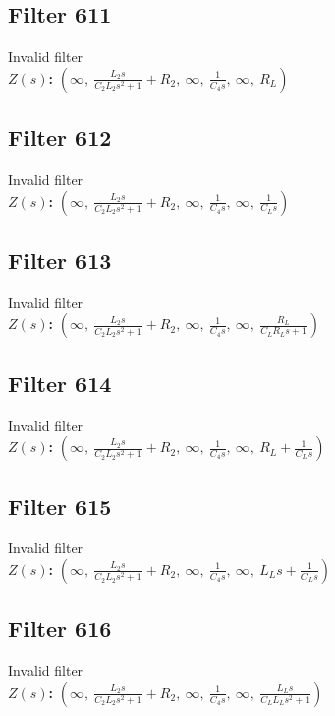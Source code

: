 \documentclass{article}
\begin{document}
\subsection*{Filter 611}
Invalid filter \\ 
\textbf{$Z(s)$:} $\left( \infty, \  \frac{L_{2} s}{C_{2} L_{2} s^{2} + 1} + R_{2}, \  \infty, \  \frac{1}{C_{4} s}, \  \infty, \  R_{L}\right)$ \\ 
\subsection*{Filter 612}
Invalid filter \\ 
\textbf{$Z(s)$:} $\left( \infty, \  \frac{L_{2} s}{C_{2} L_{2} s^{2} + 1} + R_{2}, \  \infty, \  \frac{1}{C_{4} s}, \  \infty, \  \frac{1}{C_{L} s}\right)$ \\ 
\subsection*{Filter 613}
Invalid filter \\ 
\textbf{$Z(s)$:} $\left( \infty, \  \frac{L_{2} s}{C_{2} L_{2} s^{2} + 1} + R_{2}, \  \infty, \  \frac{1}{C_{4} s}, \  \infty, \  \frac{R_{L}}{C_{L} R_{L} s + 1}\right)$ \\ 
\subsection*{Filter 614}
Invalid filter \\ 
\textbf{$Z(s)$:} $\left( \infty, \  \frac{L_{2} s}{C_{2} L_{2} s^{2} + 1} + R_{2}, \  \infty, \  \frac{1}{C_{4} s}, \  \infty, \  R_{L} + \frac{1}{C_{L} s}\right)$ \\ 
\subsection*{Filter 615}
Invalid filter \\ 
\textbf{$Z(s)$:} $\left( \infty, \  \frac{L_{2} s}{C_{2} L_{2} s^{2} + 1} + R_{2}, \  \infty, \  \frac{1}{C_{4} s}, \  \infty, \  L_{L} s + \frac{1}{C_{L} s}\right)$ \\ 
\subsection*{Filter 616}
Invalid filter \\ 
\textbf{$Z(s)$:} $\left( \infty, \  \frac{L_{2} s}{C_{2} L_{2} s^{2} + 1} + R_{2}, \  \infty, \  \frac{1}{C_{4} s}, \  \infty, \  \frac{L_{L} s}{C_{L} L_{L} s^{2} + 1}\right)$ \\ 
\end{document}
